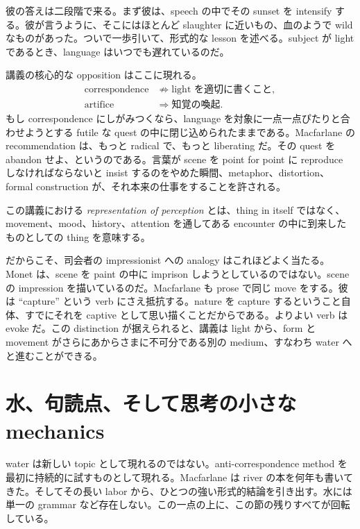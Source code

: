 彼の答えは二段階で来る。まず彼は、speech の中でその sunset を intensify する。彼が言うように、そこにはほとんど slaughter に近いもの、血のようで wild なものがあった。ついで一歩引いて、形式的な lesson を述べる。subject が light であるとき、language はいつでも遅れているのだ。

講義の核心的な opposition はここに現れる。
\begin{align}
\text{correspondence} &\not\Rightarrow \text{light を適切に書くこと},\\
\text{artifice} &\Rightarrow \text{知覚の喚起}.
\end{align}
もし correspondence にしがみつくなら、language を対象に一点一点ぴたりと合わせようとする futile な quest の中に閉じ込められたままである。Macfarlane の recommendation は、もっと radical で、もっと liberating だ。その quest を abandon せよ、というのである。言葉が scene を point for point に reproduce しなければならないと insist するのをやめた瞬間、metaphor、distortion、formal construction が、それ本来の仕事をすることを許される。

\begin{definition}
この講義における \emph{representation of perception} とは、thing in itself ではなく、movement、mood、history、attention を通してある encounter の中に到来したものとしての thing を意味する。
\end{definition}

だからこそ、司会者の impressionist への analogy はこれほどよく当たる。Monet は、scene を paint の中に imprison しようとしているのではない。scene の impression を描いているのだ。Macfarlane も prose で同じ move をする。彼は ``capture'' という verb にさえ抵抗する。nature を capture するということ自体、すでにそれを captive として思い描くことだからである。よりよい verb は evoke だ。この distinction が据えられると、講義は light から、form と movement がさらにあからさまに不可分である別の medium、すなわち water へと進むことができる。

\section{水、句読点、そして思考の小さな mechanics}

water は新しい topic として現れるのではない。anti-correspondence method を最初に持続的に試すものとして現れる。Macfarlane は river の本を何年も書いてきた。そしてその長い labor から、ひとつの強い形式的結論を引き出す。水には単一の grammar など存在しない。この一点の上に、この節の残りすべてが回転している。

